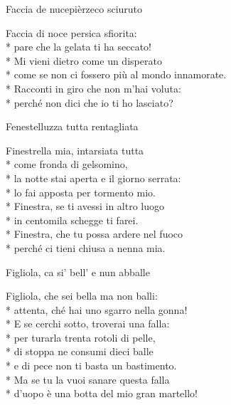 \documentclass[11pt]{book}
\begin{document}
\begin{poem}{Faccia de nucepièrzeco sciuruto}{}
\settowidth{\versewidth}{Come se non ci fossero più al mondo innamorate}
\begin{altverse}
Faccia di noce persica sfiorita:\\*
pare che la gelata ti ha seccato!\\*
Mi vieni dietro come un disperato\\*
come se non ci fossero più al mondo innamorate.\\*
Racconti in giro che non m’hai voluta:\\*
perché non dici che io ti ho lasciato?
\end{altverse}
\end{poem}

\begin{poem}{Fenestelluzza tutta rentagliata}{}
\settowidth{\versewidth}{La notte stai aperta e il giorno serrata}
\begin{altverse}
Finestrella mia, intarsiata tutta\\*
come fronda di gelsomino,\\*
la notte stai aperta e il giorno serrata:\\*
lo fai apposta per tormento mio.\\*
Finestra, se ti avessi in altro luogo\\*
in centomila schegge ti farei.\\*
Finestra, che tu possa ardere nel fuoco\\*
perché ci tieni chiusa a nenna mia.
\end{altverse}
\end{poem}

\begin{poem}{Figliola, ca si’ bell’ e nun abballe}{}
\settowidth{\versewidth}{D’uopo è una botta del mio gran martello}
\begin{altverse}
Figliola, che sei bella ma non balli:\\*
attenta, ché hai uno sgarro nella gonna!\\*
E se cerchi sotto, troverai una falla:\\*
per turarla trenta rotoli di pelle,\\*
di stoppa ne consumi dieci balle\\*
e di pece non ti basta un bastimento.\\*
Ma se tu la vuoi sanare questa falla\\*
d’uopo è una botta del mio gran martello!
\end{altverse}
\end{poem}
\end{document}
